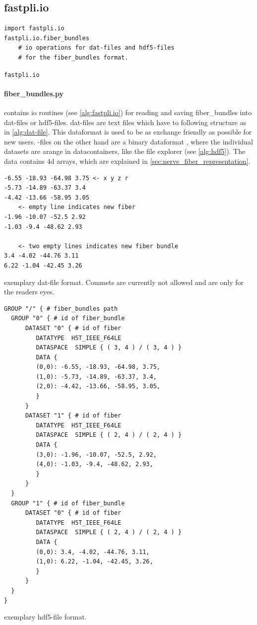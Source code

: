 \subsection{fastpli.io}
\begin{lstfloat}[!t]
\lstset{style=python}
\begin{lstlisting}
import fastpli.io
fastpli.io.fiber_bundles
    # io operations for dat-files and hdf5-files
    # for the fiber_bundles format.
\end{lstlisting}
\caption{\texttt{fastpli.io}}\label{alg:fastpli.io}
\end{lstfloat}
% 
\paragraph{fiber\_bundles.py} contains io routines (see \cref{alg:fastpli.io}) for reading and saving fiber\_bundles into dat-files or hdf5-files. dat-files are text files which have to following structure as in \cref{alg:dat-file}. This dataformat is used to be as exchange friendly as possible for new users. \hdf-files on the other hand are a binary dataformat \cite{hdf5}, where the individual datasets are arange in datacontainers, like the file explorer (see \cref{alg:hdf5}). The data contains 4d arrays, which are explained in \cref{sec:nerve_fiber_representation}.
% 
\begin{lstfloat}[!t]
\begin{lstlisting}
-6.55 -18.93 -64.98 3.75 <- x y z r
-5.73 -14.89 -63.37 3.4
-4.42 -13.66 -58.95 3.05
    <- empty line indicates new fiber
-1.96 -10.07 -52.5 2.92
-1.03 -9.4 -48.62 2.93

    <- two empty lines indicates new fiber bundle
3.4 -4.02 -44.76 3.11
6.22 -1.04 -42.45 3.26
\end{lstlisting}
\caption{exemplary dat-file format. Commets are currently not allowed and are only for the readers eyes.}\label{alg:dat-file}
\end{lstfloat}
% 
\begin{lstfloat}[!t]
\lstset{style=common}
\begin{lstlisting}
GROUP "/" { # fiber_bundles path
  GROUP "0" { # id of fiber_bundle
      DATASET "0" { # id of fiber
         DATATYPE  H5T_IEEE_F64LE
         DATASPACE  SIMPLE { ( 3, 4 ) / ( 3, 4 ) }
         DATA {
         (0,0): -6.55, -18.93, -64.98, 3.75,
         (1,0): -5.73, -14.89, -63.37, 3.4,
         (2,0): -4.42, -13.66, -58.95, 3.05,
         }
      }
      DATASET "1" { # id of fiber
         DATATYPE  H5T_IEEE_F64LE
         DATASPACE  SIMPLE { ( 2, 4 ) / ( 2, 4 ) }
         DATA {
         (3,0): -1.96, -10.07, -52.5, 2.92,
         (4,0): -1.03, -9.4, -48.62, 2.93,
         }
      }
  }
  GROUP "1" { # id of fiber_bundle
      DATASET "0" { # id of fiber
         DATATYPE  H5T_IEEE_F64LE
         DATASPACE  SIMPLE { ( 2, 4 ) / ( 2, 4 ) }
         DATA {
         (0,0): 3.4, -4.02, -44.76, 3.11,
         (1,0): 6.22, -1.04, -42.45, 3.26,
         }
      }
  }
}
\end{lstlisting}
\caption{exemplary hdf5-file format.} \label{alg:hdf5}
\end{lstfloat}
% 
% 
